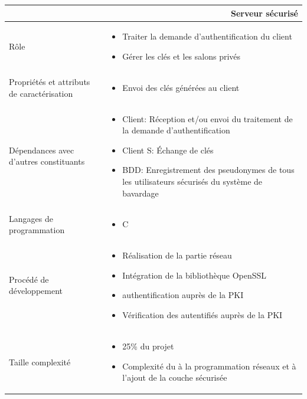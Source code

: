 \documentclass[a4paper,11pt,french]{article}
\begin{document}
\begin{center}
	\vspace*{0.7cm}
	\begin{tabularx}{16cm}{|l|X|}
	\hline
	\multicolumn{2}{|r|}{\textbf{Serveur sécurisé}}\\
	\hline
	R\^ole &  \begin{itemize}\item Traiter la demande d'authentification du client \item Gérer les clés et les salons privés\end{itemize}\\
	\hline
	Propriétés et attributs de caractérisation & \begin{itemize}\item Envoi des clés générées au client \end{itemize}\\
	\hline
	Dépendances avec d'autres constituants & \begin{itemize}\item Client: Réception et/ou envoi du traitement de la demande d'authentification \item Client S: \'Echange de clés \item BDD: Enregistrement des pseudonymes de tous les utilisateurs sécurisés du système de bavardage \end{itemize} \\
	\hline
	Langages de programmation & \begin{itemize} \item C \end{itemize}\\
	\hline
	Procédé de développement & \begin{itemize}\item Réalisation de la partie réseau \item Intégration de la bibliothèque OpenSSL \item authentification auprès de la PKI \item Vérification des autentifiés auprès de la PKI \end{itemize}\\
	\hline
	Taille complexité & \begin{itemize}\item 25\% du projet \item Complexité du à la programmation réseaux et à l'ajout de la couche sécurisée \end{itemize}\\
	\hline
	\end{tabularx}
\end{center}
\end{document}
